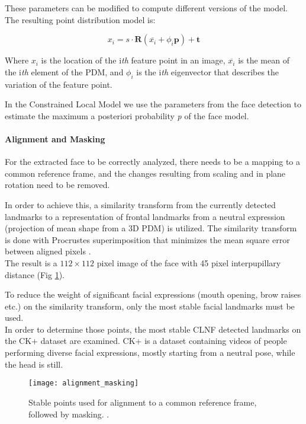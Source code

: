These parameters can be modified to compute different versions of the model. The resulting point distribution model is:

\begin{equation} \label{eq:pdm}
	x_i = s \cdot \mathbf{R}(\overline{x_i} + \phi_i \mathbf{p}) + \mathbf{t}
\end{equation}

Where $x_i$ is the location of the i\textit{th} feature point in an image, $\overline{x_i}$ is the mean of the i\textit{th} element of the PDM, and $\phi_i$ is the i\textit{th} eigenvector that describes the variation of the feature point.

In the Constrained Local Model we use the parameters from the face detection to estimate the maximum a posteriori probability \textit{p} of the face model.

\paragraph{Alignment and Masking}
For the extracted face to be correctly analyzed, there needs to be a mapping to a common reference frame, and the changes resulting from scaling and in plane rotation need to be removed. 

In order to achieve this, a similarity transform from the currently detected landmarks to a representation of frontal landmarks from a neutral expression (projection of mean shape from a 3D PDM) is utilized. The similarity transform is done with Procrustes superimposition that minimizes the mean square error between aligned pixels \cite{Baltru2013}.\\
The result is a $112 \times 112$ pixel image of the face with 45 pixel interpupillary distance (Fig \ref{fig:alignment_masking}). 

To reduce the weight of significant facial expressions (mouth opening, brow raises etc.) on the similarity transform, only the most stable facial landmarks must be used. \\
In order to determine those points, the most stable CLNF detected landmarks on the CK+ dataset \cite{CK+} are examined. CK+ is a dataset containing videos of people performing diverse facial expressions, mostly starting from a neutral pose, while the head is still.

\begin{figure}[H]
	\centering
	\texttt{[image: alignment\_masking]}
	\caption{Stable points used for alignment to a common reference frame, followed by masking. \cite{Baltru2015}.}
	\label{fig:alignment_masking}
\end{figure}

